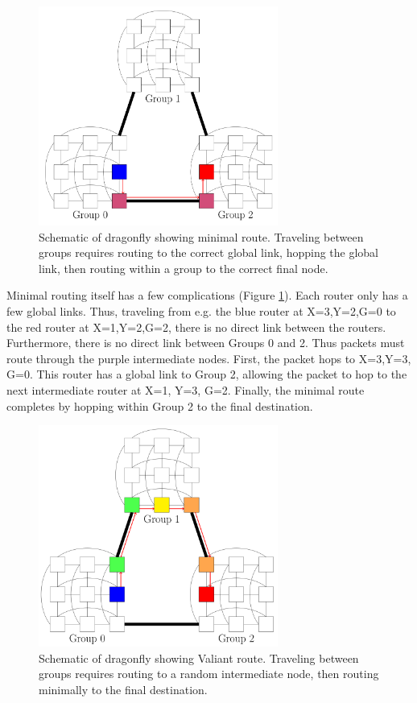 \begin{figure}[h!]
\centering
\includegraphics[width=0.7\textwidth]{figures/tikz/dragonfly/dflyminroute.png}
\caption{Schematic of dragonfly showing minimal route. Traveling between groups requires routing to the correct global link, hopping the global link, then routing within a group to the correct final node.}
\label{fig:topologies:dflyminroute}
\end{figure}

Minimal routing itself has a few complications (Figure \ref{fig:topologies:dflyminroute}).  
Each router only has a few global links.  
Thus, traveling from e.g. the blue router at X=3,Y=2,G=0 to the red router at X=1,Y=2,G=2, there is no direct link between the routers.
Furthermore, there is no direct link between Groups 0 and 2.
Thus packets must route through the purple intermediate nodes.
First, the packet hops to X=3,Y=3, G=0.  
This router has a global link to Group 2, allowing the packet to hop to the next intermediate router at X=1, Y=3, G=2.
Finally, the minimal route completes by hopping within Group 2 to the final destination.

\begin{figure}[h!]
\centering
\includegraphics[width=0.7\textwidth]{figures/tikz/dragonfly/dflyvaliant.png}
\caption{Schematic of dragonfly showing Valiant route. Traveling between groups requires routing to a random intermediate node, then routing minimally to the final destination.}
\label{fig:topologies:dflyvaliantroute}
\end{figure}

